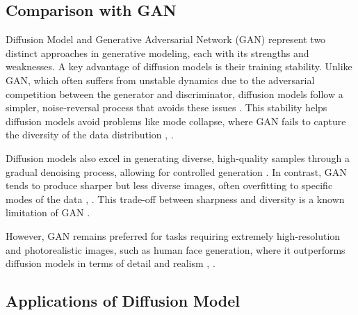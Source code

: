 \subsection{Comparison with GAN}

Diffusion Model and Generative Adversarial Network (GAN) represent two distinct approaches in generative modeling, each with its strengths and weaknesses. A key advantage of diffusion models is their training stability. Unlike GAN, which often suffers from unstable dynamics due to the adversarial competition between the generator and discriminator, diffusion models follow a simpler, noise-reversal process that avoids these issues \citep{10.1109/access.2023.3272032}. This stability helps diffusion models avoid problems like mode collapse, where GAN fails to capture the diversity of the data distribution \citep{10.1049/ipr2.12487}, \citep{10.3390/e25121657}.

Diffusion models also excel in generating diverse, high-quality samples through a gradual denoising process, allowing for controlled generation \citep{10.1117/1.jei.32.4.043029}. In contrast, GAN tends to produce sharper but less diverse images, often overfitting to specific modes of the data \citep{10.48550/arxiv.1910.04302}, \citep{10.48550/arxiv.2207.01561}. This trade-off between sharpness and diversity is a known limitation of GAN \citep{10.1111/rssb.12476}.

However, GAN remains preferred for tasks requiring extremely high-resolution and photorealistic images, such as human face generation, where it outperforms diffusion models in terms of detail and realism \citep{10.54254/2755-2721/18/20230984}, \citep{10.3390/e22091055}.

\subsection{Applications of Diffusion Model}


